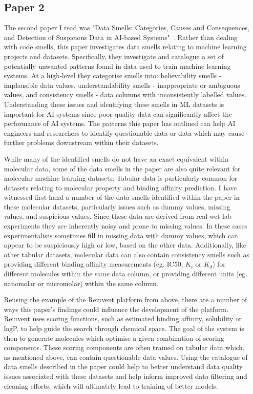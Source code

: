 \documentclass{article}
\begin{document}
\subsection{Paper 2}

The second paper I read was "Data Smells: Categories, Causes and Consequences, and Detection of Suspicious Data in AI-based Systems"~\cite{data-smells}. Rather than dealing with code smells, this paper investigates data smells relating to machine learning projects and datasets. Specifically, they investigate and catalogue a set of potentially unwanted patterns found in data used to train machine learning systems. At a high-level they categorise smells into: believability smells - implausible data values, understandability smells - inappropriate or ambiguous values, and consistency smells - data columns with inconsistently labelled values. Understanding these issues and identifying these smells in ML datasets is important for AI systems since poor quality data can significantly affect the performance of AI systems. The patterns this paper has outlined can help AI engineers and researchers to identify questionable data or data which may cause further problems downstream within their datasets.

While many of the identified smells do not have an exact equivalent within molecular data, some of the data smells in the paper are also quite relevant for molecular machine learning datasets. Tabular data is particularly common for datasets relating to molecular property and binding affinity prediction. I have witnessed first-hand a number of the data smells identified within the paper in these molecular datasets, particularly issues such as dummy values, missing values, and suspicious values. Since these data are derived from real wet-lab experiments they are inherently noisy and prone to missing values. In these cases experimentalists sometimes fill in missing data with dummy values, which can appear to be suspiciously high or low, based on the other data. Additionally, like other tabular datasets, molecular data can also contain consistency smells such as providing different binding affinity measurements (eg. IC50, $K_i$ or $K_d$) for different molecules within the same data column, or providing different units (eg. nanomolar or micromolar) within the same column.

Reusing the example of the Reinvent platform from above, there are a number of ways this paper's findings could influence the development of the platform. Reinvent uses scoring functions, such as estimated binding affinity, solubility or logP, to help guide the search through chemical space. The goal of the system is then to generate molecules which optimise a given combination of scoring components. These scoring components are often trained on tabular data which, as mentioned above, can contain questionable data values. Using the catalogue of data smells described in the paper could help to better understand data quality issues associated with these datasets and help inform improved data filtering and cleaning efforts, which will ultimately lead to training of better models.
\end{document}
